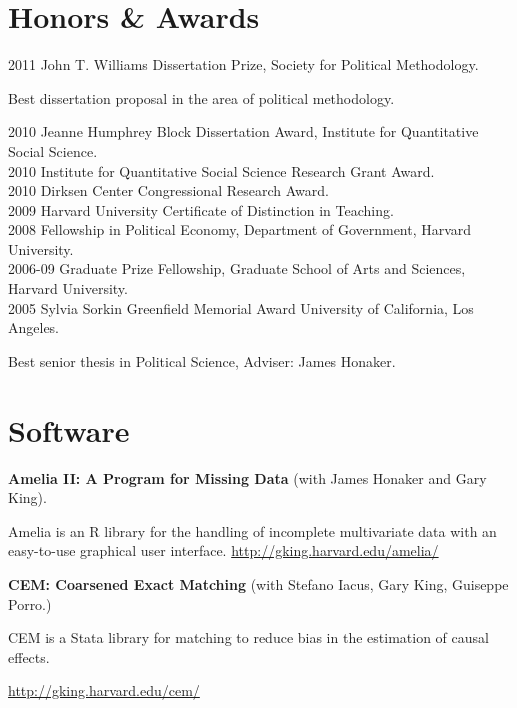 \documentclass[margin,line]{res}
\newenvironment{list1}{
  \begin{list}{\ding{113}}{%
      \setlength{\itemsep}{0in}
      \setlength{\parsep}{0in} \setlength{\parskip}{0in}
      \setlength{\topsep}{0in} \setlength{\partopsep}{0in} 
      \setlength{\leftmargin}{0.17in}}}{\end{list}}
\begin{document}
\begin{resume}
\section{\sc Honors \& Awards}
2011 John T. Williams Dissertation Prize, Society for Political Methodology.
\begin{list1} 
\item[] Best dissertation proposal in the area of political methodology.
\end{list1}
\vspace{-1em}
2010 Jeanne Humphrey Block Dissertation Award, Institute for Quantitative Social Science. \\
2010 Institute for Quantitative Social Science Research Grant Award.\\
2010 Dirksen Center Congressional Research Award.\\
2009 Harvard University Certificate of Distinction in Teaching. \\
2008 Fellowship in Political Economy, Department of Government, Harvard
University.\\
2006-09 Graduate Prize Fellowship, Graduate School of Arts and Sciences, Harvard
University.\\
2005 Sylvia Sorkin Greenfield Memorial Award University of California, Los Angeles.
\begin{list1} 
\item[] Best senior thesis in Political Science, Adviser: James Honaker.
\end{list1}



\section{\sc Software}
{\bf Amelia II: A Program for Missing Data} (with James Honaker and Gary
King). 
\begin{list1}
\item[] Amelia is an R library for the handling of incomplete multivariate
  data with an easy-to-use graphical user
  interface. \url{http://gking.harvard.edu/amelia/} 
\end{list1}
{\bf CEM: Coarsened Exact Matching} (with Stefano Iacus, Gary
King, Guiseppe  Porro.)
\begin{list1}
\item[] CEM is a Stata library for matching to reduce bias in the estimation of
  causal effects. 
\item[] \url{http://gking.harvard.edu/cem/}
\end{list1}


\end{resume}
\end{document}
